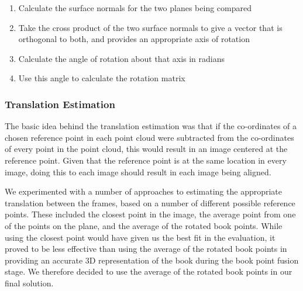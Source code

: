\begin{enumerate}
	\item Calculate the surface normals for the two planes being compared
	\item Take the cross product of the two surface normals to give a vector that is orthogonal to both, and provides an appropriate axis of rotation
	\item Calculate the angle of rotation about that axis in radians
	\item Use this angle to calculate the rotation matrix 
\end{enumerate}

\subsubsection{Translation Estimation}

The basic idea behind the translation estimation was that if the co-ordinates of a chosen reference point in each point cloud were subtracted from the co-ordinates of every point in the point cloud, this would result in an image centered at the reference point. Given that the reference point is at the same location in every image, doing this to each image should result in each image being aligned.

We experimented with a number of approaches to estimating the appropriate translation between the frames, based on a number of different possible reference points. These included the closest point in the image, the average point from one of the points on the plane, and the average of the rotated book points. While using the closest point would have given us the best fit in the evaluation, it proved to be less effective than using the average of the rotated book points in providing an accurate 3D representation of the book during the book point fusion stage. We therefore decided to use the average of the rotated book points in our final solution.





